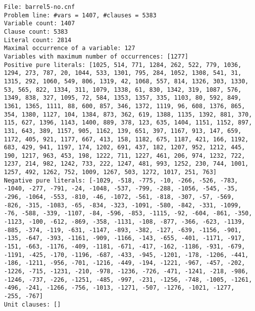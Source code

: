 \documentclass[a4paper,10pt]{article}
\begin{document}
\begin{lstlisting}
File: barrel5-no.cnf
Problem line: #vars = 1407, #clauses = 5383
Variable count: 1407
Clause count: 5383
Literal count: 2814
Maximal occurrence of a variable: 127
Variables with maximum number of occurrences: [1277]
Positive pure literals: [1025, 514, 771, 1284, 262, 522, 779, 1036, 1294, 273, 787, 20, 1044, 533, 1301, 795, 284, 1052, 1308, 541, 31, 1315, 292, 1060, 549, 806, 1319, 42, 1068, 557, 814, 1326, 303, 1330, 53, 565, 822, 1334, 311, 1079, 1338, 61, 830, 1342, 319, 1087, 576, 1349, 838, 327, 1095, 72, 584, 1353, 1357, 335, 1103, 80, 592, 849, 1361, 1365, 1111, 88, 600, 857, 346, 1372, 1119, 96, 608, 1376, 865, 354, 1380, 1127, 104, 1384, 873, 362, 619, 1388, 1135, 1392, 881, 370, 115, 627, 1396, 1143, 1400, 889, 378, 123, 635, 1404, 1151, 1152, 897, 131, 643, 389, 1157, 905, 1162, 139, 651, 397, 1167, 913, 147, 659, 1172, 405, 921, 1177, 667, 413, 158, 1182, 675, 1187, 421, 166, 1192, 683, 429, 941, 1197, 174, 1202, 691, 437, 182, 1207, 952, 1212, 445, 190, 1217, 963, 453, 198, 1222, 711, 1227, 461, 206, 974, 1232, 722, 1237, 214, 982, 1242, 733, 222, 1247, 481, 993, 1252, 230, 744, 1001, 1257, 492, 1262, 752, 1009, 1267, 503, 1272, 1017, 251, 763]
Negative pure literals: [-1029, -518, -775, -10, -266, -526, -783, -1040, -277, -791, -24, -1048, -537, -799, -288, -1056, -545, -35, -296, -1064, -553, -810, -46, -1072, -561, -818, -307, -57, -569, -826, -315, -1083, -65, -834, -323, -1091, -580, -842, -331, -1099, -76, -588, -339, -1107, -84, -596, -853, -1115, -92, -604, -861, -350, -1123, -100, -612, -869, -358, -1131, -108, -877, -366, -623, -1139, -885, -374, -119, -631, -1147, -893, -382, -127, -639, -1156, -901, -135, -647, -393, -1161, -909, -1166, -143, -655, -401, -1171, -917, -151, -663, -1176, -409, -1181, -671, -417, -162, -1186, -931, -679, -1191, -425, -170, -1196, -687, -433, -945, -1201, -178, -1206, -441, -186, -1211, -956, -701, -1216, -449, -194, -1221, -967, -457, -202, -1226, -715, -1231, -210, -978, -1236, -726, -471, -1241, -218, -986, -1246, -737, -226, -1251, -485, -997, -231, -1256, -748, -1005, -1261, -496, -241, -1266, -756, -1013, -1271, -507, -1276, -1021, -1277, -255, -767]
Unit clauses: []
\end{lstlisting}
\end{document}

